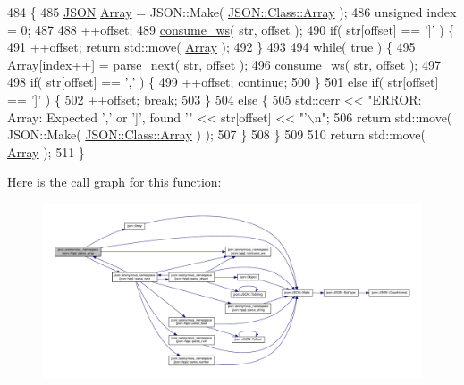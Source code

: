 \begin{DoxyCode}
484                                                           \{
485         \mbox{\hyperlink{class_j_s_o_n}{JSON}} \mbox{\hyperlink{namespacejson_a8c39b1bf99577bc140f0647d0192219f}{Array}} = JSON::Make( \mbox{\hyperlink{namespacejson_a8c39b1bf99577bc140f0647d0192219f}{JSON::Class::Array}} );
486         \textcolor{keywordtype}{unsigned} index = 0;
487         
488         ++offset;
489         \mbox{\hyperlink{namespacejson_1_1anonymous__namespace_02json_8hpp_03_a3a6e9a9e2d1cf7848055ae69f04be8b7}{consume\_ws}}( str, offset );
490         \textcolor{keywordflow}{if}( str[offset] == \textcolor{charliteral}{']'} ) \{
491             ++offset; \textcolor{keywordflow}{return} std::move( \mbox{\hyperlink{namespacejson_a8c39b1bf99577bc140f0647d0192219f}{Array}} );
492         \}
493 
494         \textcolor{keywordflow}{while}( \textcolor{keyword}{true} ) \{
495             \mbox{\hyperlink{namespacejson_a8c39b1bf99577bc140f0647d0192219f}{Array}}[index++] = \mbox{\hyperlink{namespacejson_1_1anonymous__namespace_02json_8hpp_03_acd55b945d1583038db8633516df7cf3f}{parse\_next}}( str, offset );
496             \mbox{\hyperlink{namespacejson_1_1anonymous__namespace_02json_8hpp_03_a3a6e9a9e2d1cf7848055ae69f04be8b7}{consume\_ws}}( str, offset );
497 
498             \textcolor{keywordflow}{if}( str[offset] == \textcolor{charliteral}{','} ) \{
499                 ++offset; \textcolor{keywordflow}{continue};
500             \}
501             \textcolor{keywordflow}{else} \textcolor{keywordflow}{if}( str[offset] == \textcolor{charliteral}{']'} ) \{
502                 ++offset; \textcolor{keywordflow}{break};
503             \}
504             \textcolor{keywordflow}{else} \{
505                 std::cerr << \textcolor{stringliteral}{"ERROR: Array: Expected ',' or ']', found '"} << str[offset] << \textcolor{stringliteral}{"'\(\backslash\)n"};
506                 \textcolor{keywordflow}{return} std::move( JSON::Make( \mbox{\hyperlink{namespacejson_a8c39b1bf99577bc140f0647d0192219f}{JSON::Class::Array}} ) );
507             \}
508         \}
509 
510         \textcolor{keywordflow}{return} std::move( \mbox{\hyperlink{namespacejson_a8c39b1bf99577bc140f0647d0192219f}{Array}} );
511     \}
\end{DoxyCode}
Here is the call graph for this function\+:
\nopagebreak
\begin{figure}[H]
\begin{center}
\leavevmode
\includegraphics[width=350pt]{namespacejson_1_1anonymous__namespace_02json_8hpp_03_a6a3598f1545d6015c9db8015fc42f7ff_cgraph}
\end{center}
\end{figure}
